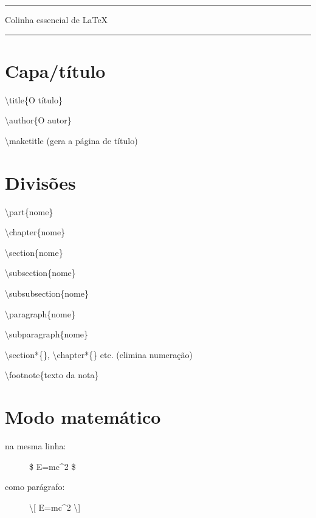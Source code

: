 \documentclass[11pt,twoside,english,brazil]{article}
\begin{document}
{
  \centering
  \Large\bfseries

  \rule[.6ex]{.2\textwidth}{1pt}
  \quad\space Colinha essencial de \LaTeX \quad\space
  \rule[.6ex]{.2\textwidth}{1pt}\par
}

\setlength{\columnsep}{20pt}
\setlength{\columnseprule}{.2pt}
\begin{multicols}{3}

\section*{Capa/título}

\textbackslash{}title\{O título\}

\textbackslash{}author\{O autor\}

\textbackslash{}maketitle (gera a página de título)


\section*{Divisões}

\textbackslash{}part\{nome\}

\textbackslash{}chapter\{nome\}

\textbackslash{}section\{nome\}

\textbackslash{}subsection\{nome\}

\textbackslash{}subsubsection\{nome\}

\textbackslash{}paragraph\{nome\}

\textbackslash{}subparagraph\{nome\}

\textbackslash{}section*\{\},
\textbackslash{}chapter*\{\} etc.
(elimina numeração)


\vspace{\baselineskip}


\textbackslash{}footnote\{texto da nota\}


\section*{Modo matemático}

\begin{description}
  \item[na mesma linha:] \$ E=mc\^{}2 \$
  \item[como parágrafo:] \textbackslash[ E=mc\^{}2 \textbackslash]
\end{description}


\vspace{\baselineskip}



\end{multicols}
\end{document}
